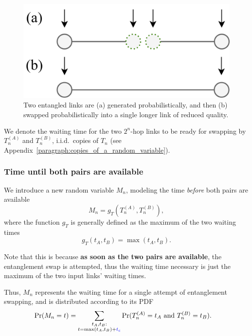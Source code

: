 \documentclass{masterthesis}
\begin{document}
\begin{figure}[ht]
    \centering
    \includegraphics[width=0.66\linewidth]{images/swap.png}
    \caption{Two entangled links are (a) generated probabilistically, and then (b) swapped probabilistically into a single longer link of reduced quality.}\label{fig:entanglement_swapping}
\end{figure}

We denote the waiting time for the two $2^n$-hop links to be ready for swapping by $T_n^{(A)}$ and $T_n^{(B)}$, i.i.d.\ copies of $T_n$ (see Appendix~\ref{paragraph:copies_of_a_random_variable}).

\subsubsection*{Time until both pairs are available}

We introduce a new random variable $M_n$, modeling the time \textit{before} both pairs are available
\begin{equation}\label{eq:waiting_time_pair}
    M_n = g_T(T_n^{(A)} , T_n^{(B)}) ,
\end{equation}
where the function $g_T$ is generally defined as the maximum of the two waiting times
\begin{equation}\label{eq:waiting_time_pair_max}
    g_T(t_A, t_B) = \max(t_A, t_B) .
\end{equation}

Note that this is because \textbf{as soon as the two pairs are available}, the entanglement swap is attempted, thus the waiting time necessary is just the maximum of the two input links' waiting times.

Thus, $M_n$ represents the waiting time for a single attempt of entanglement swapping, and is distributed according to its PDF
\begin{align}\label{eq:pdf_waiting_time_pair}
    \Pr(M_n = t) &= \sum_{\substack{t_A, t_B: \\ t = \max(t_A, t_B) + \textcolor{blue}{t_c}}} \Pr(T_n^{(A)} = t_A \text{ and } T_n^{(B)} = t_B) .
\end{align}
\end{document}
